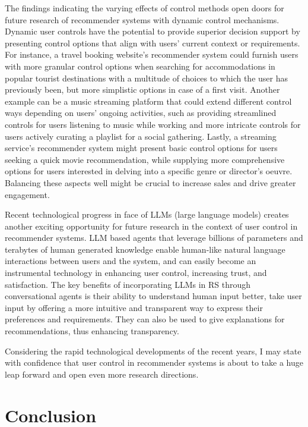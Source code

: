 \documentclass[a4paper,12pt]{article}
\begin{document}
The findings indicating the varying effects of control methods open doors for future research of recommender systems with dynamic control mechanisms. Dynamic user controls have the potential to provide superior decision support by presenting control options that align with users' current context or requirements. For instance, a travel booking website's recommender system could furnish users with more granular control options when searching for accommodations in popular tourist destinations with a multitude of choices to which the user has previously been, but more simplistic options in case of a first visit. Another example can be a music streaming platform that could extend different control ways depending on users' ongoing activities, such as providing streamlined controls for users listening to music while working and more intricate controls for users actively curating a playlist for a social gathering. Lastly, a streaming service's recommender system might present basic control options for users seeking a quick movie recommendation, while supplying more comprehensive options for users interested in delving into a specific genre or director's oeuvre. Balancing these aspects well might be crucial to increase sales and drive greater engagement.

Recent technological progress in face of LLMs (large language models) creates another exciting opportunity for future research in the context of user control in recommender systems. LLM based agents that leverage billions of parameters and terabytes of human generated knowledge enable human-like natural language interactions between users and the system, and can easily become an instrumental technology in enhancing user control, increasing trust, and satisfaction. The key benefits of incorporating LLMs in RS through conversational agents is their ability to understand human input better, take user input by offering a more intuitive and transparent way to express their preferences and requirements. They can also be used to give explanations for recommendations, thus enhancing transparency.

Considering the rapid technological developments of the recent years, I may state with confidence that user control in recommender systems is about to take a huge leap forward and open even more research directions. 

\newpage

\section{Conclusion}
\end{document}
